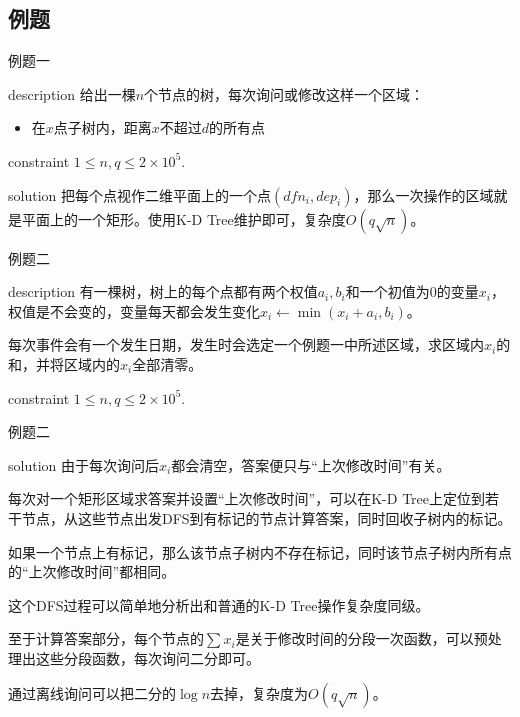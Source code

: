 \documentclass{beamer}
\begin{document}
\subsection{例题}
\begin{frame}{例题一}
\begin{block}{description}
给出一棵$n$个节点的树，每次询问或修改这样一个区域：
\begin{itemize}
	\item 在$x$点子树内，距离$x$不超过$d$的所有点
\end{itemize}
\end{block}
\begin{block}{constraint}
$1 \le n, q \le 2 \times 10^5.$
\end{block}
\pause
\begin{block}{solution}
把每个点视作二维平面上的一个点$(dfn_i, dep_i)$，那么一次操作的区域就是平面上的一个矩形。使用K-D Tree维护即可，复杂度$O(q\sqrt n)$。
\end{block}
\end{frame}
\begin{frame}{例题二}
\begin{block}{description}
有一棵树，树上的每个点都有两个权值$a_i,b_i$和一个初值为$0$的变量$x_i$，权值是不会变的，变量每天都会发生变化$x_i \gets \min(x_i+a_i, b_i)$。

每次事件会有一个发生日期，发生时会选定一个例题一中所述区域，求区域内$x_i$的和，并将区域内的$x_i$全部清零。
\end{block}
\begin{block}{constraint}
$1 \le n, q \le 2\times 10^5.$
\end{block}
\end{frame}
\begin{frame}{例题二}
\begin{block}{solution}
由于每次询问后$x_i$都会清空，答案便只与“上次修改时间”有关。

每次对一个矩形区域求答案并设置“上次修改时间”，可以在K-D Tree上定位到若干节点，从这些节点出发DFS到有标记的节点计算答案，同时回收子树内的标记。

如果一个节点上有标记，那么该节点子树内不存在标记，同时该节点子树内所有点的“上次修改时间”都相同。

这个DFS过程可以简单地分析出和普通的K-D Tree操作复杂度同级。

至于计算答案部分，每个节点的$\sum x_i$是关于修改时间的分段一次函数，可以预处理出这些分段函数，每次询问二分即可。

通过离线询问可以把二分的$\log n$去掉，复杂度为$O(q\sqrt n)$。
\end{block}
\end{frame}
\end{document}
